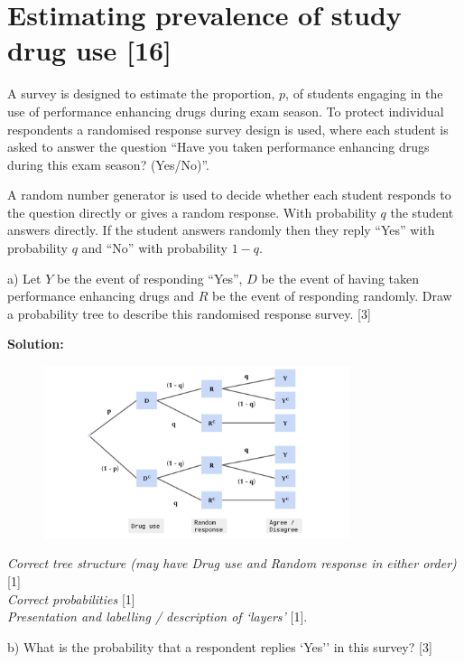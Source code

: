 \documentclass[a4paper, 11pt]{article}
\begin{document}
\section{Estimating prevalence of study drug use [16] }


A survey is designed to estimate the proportion, $p$, of students engaging in the use of performance enhancing drugs during exam season. To protect individual respondents a randomised response survey design is used, where each student is asked to answer the question ``Have you taken performance enhancing drugs during this exam season? (Yes/No)''.

A random number generator is used to decide whether each student responds to the question directly or gives a random response. With probability $q$ the student answers directly. If the student answers randomly then they reply ``Yes'' with probability $q$ and ``No'' with probability $1-q$.

a)  Let $Y$ be the event of responding ``Yes'', $D$ be the event of having taken performance enhancing drugs and $R$ be the event of responding randomly. Draw a probability tree to describe this randomised response survey. [3]

{\color{blue}
\textbf{Solution:}

\begin{figure}[h]
	\includegraphics[width = 0.8\textwidth]{figures/probability_tree_2_a.png}
\end{figure}

\textit{Correct tree structure (may have Drug use and Random response in either order)} [1] \\
\textit{Correct probabilities} [1] \\
\textit{Presentation and labelling / description of `layers'} [1].
}

b) What is the probability that a respondent replies `Yes'' in this survey? [3]
\end{document}
